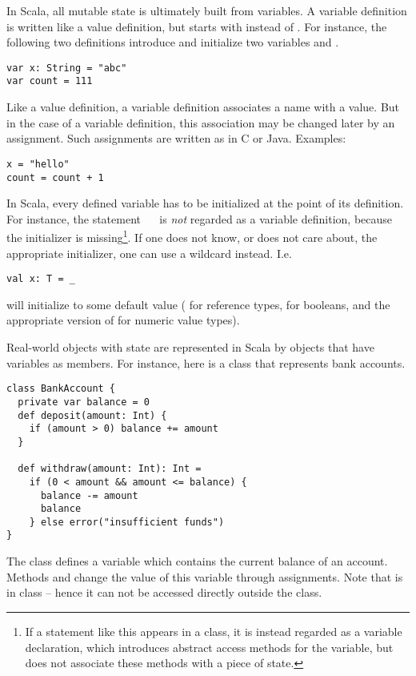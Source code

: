 In Scala, all mutable state is ultimately built from variables.  A
variable definition is written like a value definition, but starts
with \verb@var@ instead of \verb@val@. For instance, the following two
definitions introduce and initialize two variables  and
.
\begin{lstlisting}
var x: String = "abc"
var count = 111
\end{lstlisting}
Like a value definition, a variable definition associates a name with
a value. But in the case of a variable definition, this association
may be changed later by an assignment.  Such assignments are written
as in C or Java. Examples:
\begin{lstlisting}
x = "hello"
count = count + 1
\end{lstlisting}
In Scala, every defined variable has to be initialized at the point of
its definition. For instance, the statement ~~ is
{\em not} regarded as a variable definition, because the initializer
is missing\footnote{If a statement like this appears in a class, it is
instead regarded as a variable declaration, which introduces
abstract access methods for the variable, but does not associate these
methods with a piece of state.}. If one does not know, or does not
care about, the appropriate initializer, one can use a wildcard
instead. I.e.
\begin{lstlisting}
val x: T = _
\end{lstlisting}
will initialize  to some default value ( for
reference types,  for booleans, and the appropriate
version of  for numeric value types).

Real-world objects with state are represented in Scala by objects that
have variables as members. For instance, here is a class that
represents bank accounts.
\begin{lstlisting}
class BankAccount {
  private var balance = 0
  def deposit(amount: Int) {
    if (amount > 0) balance += amount
  }

  def withdraw(amount: Int): Int =
    if (0 < amount && amount <= balance) {
      balance -= amount
      balance
    } else error("insufficient funds")
}
\end{lstlisting}
The class defines a variable  which contains the current
balance of an account. Methods  and 
change the value of this variable through assignments.  Note that
 is  in class  -- hence
it can not be accessed directly outside the class.

